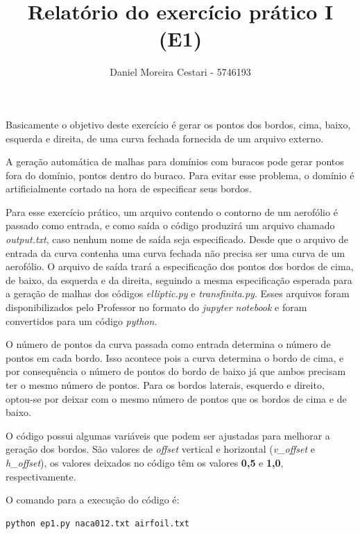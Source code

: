 \documentclass[a4paper]{article}
\title{Relatório do exercício prático I (E1)}
\author{Daniel Moreira Cestari - 5746193}
\begin{document}
\maketitle


Basicamente o objetivo deste exercício é gerar os pontos dos bordos, cima, baixo, esquerda e direita, de uma curva fechada fornecida de um arquivo externo.

A geração automática de malhas para domínios com buracos pode gerar pontos fora do domínio, pontos dentro do buraco. Para evitar esse problema, o domínio é artificialmente cortado na hora de especificar seus bordos.

Para esse exercício prático, um arquivo contendo o contorno de um aerofólio é passado como entrada, e como saída o código produzirá um arquivo chamado \textit{output.txt}, caso nenhum nome de saída seja especificado. Desde que o arquivo de entrada da curva contenha uma curva fechada não precisa ser uma curva de um aerofólio. O arquivo de saída trará a especificação dos pontos dos bordos de cima, de baixo, da esquerda e da direita, seguindo a mesma especificação esperada para a geração de malhas dos códigos \textit{elliptic.py} e \textit{transfinita.py}. Esses arquivos foram disponibilizados pelo Professor no formato do \textit{jupyter notebook} e foram convertidos para um código \textit{python}.

O número de pontos da curva passada como entrada determina o número de pontos em cada bordo. Isso acontece pois a curva determina o bordo de cima, e por consequência o número de pontos do bordo de baixo já que ambos precisam ter o mesmo número de pontos. Para os bordos laterais, esquerdo e direito, optou-se por deixar com o mesmo número de pontos que os bordos de cima e de baixo.

O código possui algumas variáveis que podem ser ajustadas para melhorar a geração dos bordos. São valores de \textit{offset} vertical e horizontal (\textit{v\_offset} e \textit{h\_offset}), os valores deixados no código têm os valores \textbf{0,5} e \textbf{1,0}, respectivamente.

O comando para a execução do código é:

\begin{lstlisting}[language=Python]
python ep1.py naca012.txt airfoil.txt
\end{lstlisting}
\end{document}
